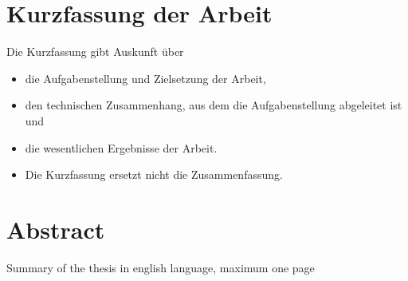 \section*{Kurzfassung der Arbeit} \label{Kurzfassung}
%
Die Kurzfassung gibt Auskunft über
\begin{itemize}
\item die Aufgabenstellung und Zielsetzung der Arbeit,
\item den technischen Zusammenhang, aus dem die Aufgabenstellung abgeleitet ist und
\item die wesentlichen Ergebnisse der Arbeit.
\item Die Kurzfassung ersetzt nicht die Zusammenfassung.
\end{itemize}



	

\vspace{4cm}

\section*{Abstract} \label{Abstract}


Summary of the thesis in english language, maximum one page\\


\cleardoublepage